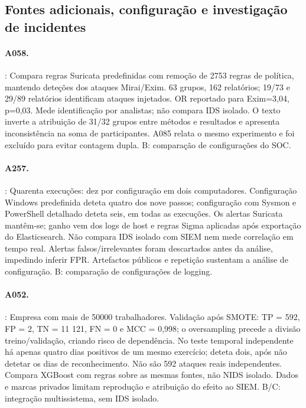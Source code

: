 \documentclass[11pt,a4paper]{article}
\begin{document}
\subsection{Fontes adicionais, configuração e investigação de incidentes}
\paragraph{A058.} \citet{saibersoc2022}: Compara regras Suricata predefinidas com remoção de 2753 regras de política, mantendo deteções dos ataques Mirai/Exim. 63 grupos, 162 relatórios; 19/73 e 29/89 relatórios identificam ataques injetados. OR reportado para Exim=3,04, p=0,03. Mede identificação por analistas; não compara IDS isolado. O texto inverte a atribuição de 31/32 grupos entre métodos e resultados e apresenta inconsistência na soma de participantes. A085 relata o mesmo experimento e foi excluído para evitar contagem dupla. B: comparação de configurações do SOC.

\paragraph{A257.} \citet{uetz2021}: Quarenta execuções: dez por configuração em dois computadores. Configuração Windows predefinida deteta quatro dos nove passos; configuração com Sysmon e PowerShell detalhado deteta seis, em todas as execuções. Os alertas Suricata mantêm-se; ganho vem dos logs de host e regras Sigma aplicadas após exportação do Elasticsearch. Não compara IDS isolado com SIEM nem mede correlação em tempo real. Alertas falsos/irrelevantes foram descartados antes da análise, impedindo inferir FPR. Artefactos públicos e repetição sustentam a análise de configuração. B: comparação de configurações de logging.

\paragraph{A052.} \citet{roelofs2024}: Empresa com mais de 50000 trabalhadores. Validação após SMOTE: TP = 592, FP = 2, TN = 11 121, FN = 0 e MCC = 0,998; o oversampling precede a divisão treino/validação, criando risco de dependência. No teste temporal independente há apenas quatro dias positivos de um mesmo exercício; deteta dois, após não detetar os dias de reconhecimento. Não são 592 ataques reais independentes. Compara XGBoost com regras sobre as mesmas fontes, não NIDS isolado. Dados e marcas privados limitam reprodução e atribuição do efeito ao SIEM. B/C: integração multissistema, sem IDS isolado.
\end{document}
